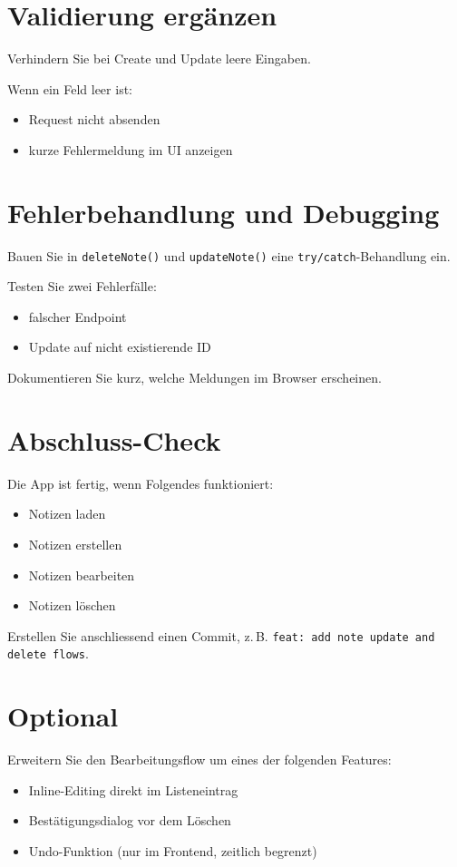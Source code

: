 \documentclass[a4paper,12pt]{article}
\begin{document}
\section{Validierung ergänzen}

Verhindern Sie bei Create und Update leere Eingaben.

Wenn ein Feld leer ist:
\begin{itemize}
    \item Request nicht absenden
    \item kurze Fehlermeldung im UI anzeigen
\end{itemize}

\section{Fehlerbehandlung und Debugging}

Bauen Sie in \texttt{deleteNote()} und \texttt{updateNote()} eine \texttt{try/catch}-Behandlung ein.

Testen Sie zwei Fehlerfälle:
\begin{itemize}
    \item falscher Endpoint
    \item Update auf nicht existierende ID
\end{itemize}

Dokumentieren Sie kurz, welche Meldungen im Browser erscheinen.

\section{Abschluss-Check}

Die App ist fertig, wenn Folgendes funktioniert:
\begin{itemize}
    \item Notizen laden
    \item Notizen erstellen
    \item Notizen bearbeiten
    \item Notizen löschen
\end{itemize}

Erstellen Sie anschliessend einen Commit, z.\,B.
\texttt{feat: add note update and delete flows}.

\section{Optional}

Erweitern Sie den Bearbeitungsflow um eines der folgenden Features:
\begin{itemize}
    \item Inline-Editing direkt im Listeneintrag
    \item Bestätigungsdialog vor dem Löschen
    \item Undo-Funktion (nur im Frontend, zeitlich begrenzt)
\end{itemize}
\end{document}
